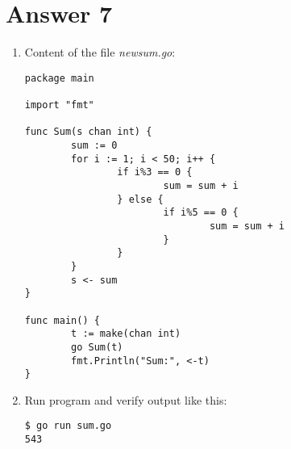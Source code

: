 \documentclass[11pt,a4paper]{article}
\begin{document}
\section*{Answer 7}
\begin{enumerate}
\item Content of the file {\it newsum.go}:
\begin{verbatim}
package main

import "fmt"

func Sum(s chan int) {
        sum := 0
        for i := 1; i < 50; i++ {
                if i%3 == 0 {
                        sum = sum + i
                } else {
                        if i%5 == 0 {
                                sum = sum + i
                        }
                }
        }
        s <- sum
}

func main() {
        t := make(chan int)
        go Sum(t)
        fmt.Println("Sum:", <-t)
}
\end{verbatim}

\item Run program and verify output like this:
\begin{verbatim}
$ go run sum.go
543
\end{verbatim}

\end{enumerate}
\end{document}
